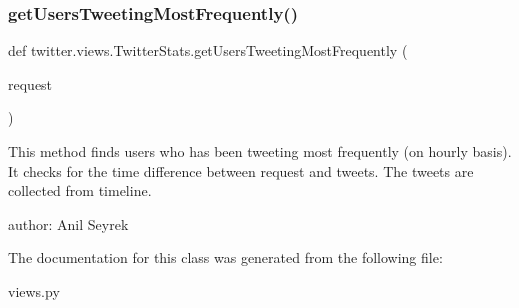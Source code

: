 \subsubsection{\texorpdfstring{get\+Users\+Tweeting\+Most\+Frequently()}{getUsersTweetingMostFrequently()}}
{\footnotesize\ttfamily def twitter.\+views.\+Twitter\+Stats.\+get\+Users\+Tweeting\+Most\+Frequently (\begin{DoxyParamCaption}\item[{}]{request }\end{DoxyParamCaption})}

\begin{DoxyVerb}This method finds users who has been tweeting most frequently (on hourly basis).
It checks for the time difference between request and tweets.
The tweets are collected from timeline.

author: Anil Seyrek
\end{DoxyVerb}
 

The documentation for this class was generated from the following file\+:\begin{DoxyCompactItemize}
\item 
views.\+py\end{DoxyCompactItemize}
